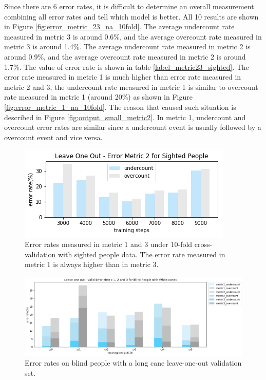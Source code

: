 \documentclass[11pt]{article}
\begin{document}
{Since there are 6 error rates, it is difficult to determine an overall measurement combining all error rates and tell which model is better. All 10 results are shown in Figure \ref{fig:error_metric_23_na_10fold}.
The average undercount rate measured in metric 3 is around 0.6\%, and the average overcount rate measured in metric 3 is around 1.4\%.  
The average undercount rate measured in metric 2 is around 0.9\%, and the average overcount rate measured in metric 2 is around 1.7\%.  
The value of error rate is shown in table \ref{label_metric23_sighted}. The error rate measured in metric 1 is much higher than error rate measured in metric 2 and 3, the undercount rate measured in metric 1 is similar to overcount rate measured in metric 1 (around 20\%) as shown in Figure \ref{fig:error_metric_1_na_10fold}. The reason that caused such situation is described in Figure \ref{fig:output_small_metric2}. In metric 1, undercount and overcount error rates are similar since a undercount event is usually followed by a overcount event and vice versa.

\begin{figure}[ht]
\centering
\includegraphics[scale=0.55]{error_metric_2_na_step}
\caption{Error rates measured in metric 1 and 3 under 10-fold cross-validation with sighted people data. The error rate measured in metric 1 is always higher than in metric 3.}
\label{fig:error_metric_2_na_step}
\end{figure}


\begin{figure}[ht]
\centering
\includegraphics[scale=0.5]{error_metric_wc_10fold_valid4000}
\caption{Error rates on blind people with a long cane leave-one-out validation set.}
\label{fig:error_metric_wc_10fold_valid4000}
\end{figure}


}
\end{document}
